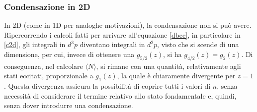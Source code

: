 \documentclass[11pt, a4paper]{scrartcl}
\theoremstyle{style}
\theoremstyle{style1}
\numberwithin{equation}{subsection}
\begin{document}
\subsubsection{Condensazione in 2D}
In 2D (come in 1D per analoghe motivazioni), la condensazione non si pu\`o avere.
Ripercorrendo i calcoli fatti per arrivare all'equazione \ref{dbec}, in particolare in \ref{c2d}, gli integrali in $d^3 p$ diventano integrali in $d^2 p$, visto che si scende di una dimensione, per cui, invece di ottenere una $g_{5 / 2} (z)$, si ha $g_{4/2} (z)=g_{2} (z)$.
Di conseguenza, nel calcolare $\langle N \rangle$, si rimane con una quantit\`a, relativamente agli stati eccitati, proporzionale a $g_1(z)$, la quale \`e chiaramente divergente per $z=1$.
Questa divergenza assicura la possibilit\`a di coprire tutti i valori di $n$, senza necessit\`a di considerare il termine relativo allo stato fondamentale e, quindi, senza dover introdurre una condensazione.
\end{document}
